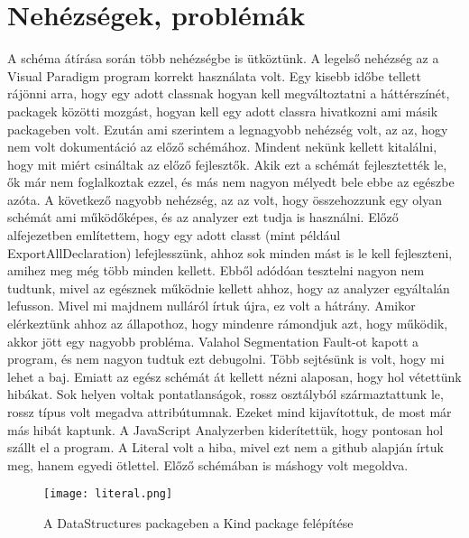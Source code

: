\section{Nehézségek, problémák}

\noindent

A schéma átírása során több nehézségbe is ütköztünk.
A legelső nehézség az a Visual Paradigm program korrekt használata volt.
Egy kisebb időbe tellett rájönni arra, hogy egy adott classnak hogyan kell megváltoztatni a háttérszínét, packagek közötti mozgást, hogyan kell egy adott classra hivatkozni ami másik packageben volt.
Ezután ami szerintem a legnagyobb nehézség volt, az az, hogy nem volt dokumentáció az előző schémához.
Mindent nekünk kellett kitalálni, hogy mit miért csináltak az előző fejlesztők. Akik ezt a schémát fejlesztették le, ők már nem foglalkoztak ezzel, és más nem nagyon mélyedt bele ebbe az egészbe azóta.
A következő nagyobb nehézség, az az volt, hogy összehozzunk egy olyan schémát ami működőképes, és az analyzer ezt tudja is használni.
Előző alfejezetben említettem, hogy egy adott classt (mint például ExportAllDeclaration) lefejlesszünk, ahhoz sok minden mást is le kell fejleszteni, amihez meg még több minden kellett.
Ebből adódóan tesztelni nagyon nem tudtunk, mivel az egésznek működnie kellett ahhoz, hogy az analyzer egyáltalán lefusson.
Mivel mi majdnem nulláról írtuk újra, ez volt a hátrány.
Amikor elérkeztünk ahhoz az állapothoz, hogy mindenre rámondjuk azt, hogy működik, akkor jött egy nagyobb probléma.
Valahol Segmentation Fault-ot kapott a program, és nem nagyon tudtuk ezt debugolni.
Több sejtésünk is volt, hogy mi lehet a baj. Emiatt az egész schémát át kellett nézni alaposan, hogy hol vétettünk hibákat.
Sok helyen voltak pontatlanságok, rossz osztályból származtattunk le, rossz típus volt megadva attribútumnak. Ezeket mind kijavítottuk, de most már más hibát kaptunk.
A JavaScript Analyzerben kiderítettük, hogy pontosan hol szállt el a program.
A Literal volt a hiba, mivel ezt nem a github alapján írtuk meg, hanem egyedi ötlettel. Előző schémában is máshogy volt megoldva.
\begin{figure}[!htbp]
      \caption{A DataStructures packageben a Kind package felépítése}\label{fig:literal}
      \centering
      \texttt{[image: literal.png]}
\end{figure}

